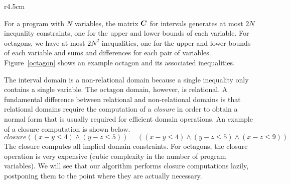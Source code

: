 \begin{wrapfigure}{r}{4.5cm}
\vspace*{-3ex}
\caption{Example of an octagon}\label{octagon}
\vspace*{-3ex}
\end{wrapfigure} 

For a program with $N$ variables, the matrix ${\boldsymbol C}$ for intervals
generates at most $2N$ inequality constraints, one for the upper and lower
bounds of each variable.
%
For octagons, we have at most $2N^2$ inequalities, one for the upper
and lower bounds of each variable and sums and differences for each
pair of variables. Figure~\ref{octagon} shows an 
example octagon and its associated inequalities.   

The interval domain is a non-relational domain because a single
inequality only contains a single variable.
%
The octagon domain, however, is relational.  A fundamental difference
between relational and non-relational domains is that relational
domains require the computation of a \emph{closure} in order to obtain
a normal form that is usually required for efficient domain operations.
An example of a closure computation is shown below.
\[\mathit{closure}((x-y \leq 4) \wedge (y-z \leq 5))=((x-y \leq 4) \wedge (y-z \leq 5) \wedge (x-z \leq 9)) \]  
The closure computes all implied domain constraints.  For octagons,
the closure operation is very expensive (cubic complexity in the
number of program variables).
%
We will see that our algorithm performs closure computations lazily,
postponing them to the point where they are actually necessary.


